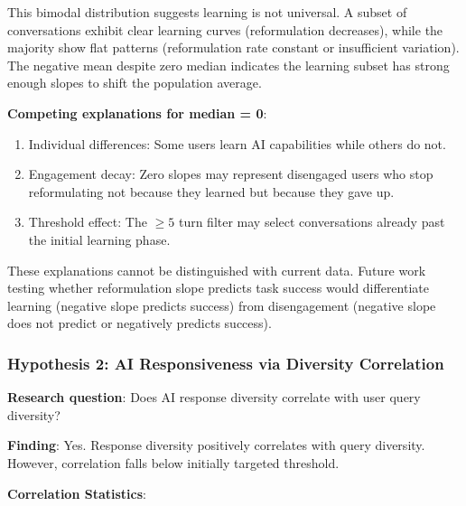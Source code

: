 This bimodal distribution suggests learning is not universal. A subset of conversations exhibit clear learning curves (reformulation decreases), while the majority show flat patterns (reformulation rate constant or insufficient variation). The negative mean despite zero median indicates the learning subset has strong enough slopes to shift the population average.

\textbf{Competing explanations for median = 0}:
\begin{enumerate}
\item Individual differences: Some users learn AI capabilities while others do not.
\item Engagement decay: Zero slopes may represent disengaged users who stop reformulating not because they learned but because they gave up.
\item Threshold effect: The $\geq 5$ turn filter may select conversations already past the initial learning phase.
\end{enumerate}

These explanations cannot be distinguished with current data. Future work testing whether reformulation slope predicts task success would differentiate learning (negative slope predicts success) from disengagement (negative slope does not predict or negatively predicts success).

\subsubsection{Hypothesis 2: AI Responsiveness via Diversity Correlation}

\textbf{Research question}: Does AI response diversity correlate with user query diversity?

\textbf{Finding}: Yes. Response diversity positively correlates with query diversity. However, correlation falls below initially targeted threshold.

\textbf{Correlation Statistics}:

\begin{table}[htbp]
\centering
{}
\end{table}

